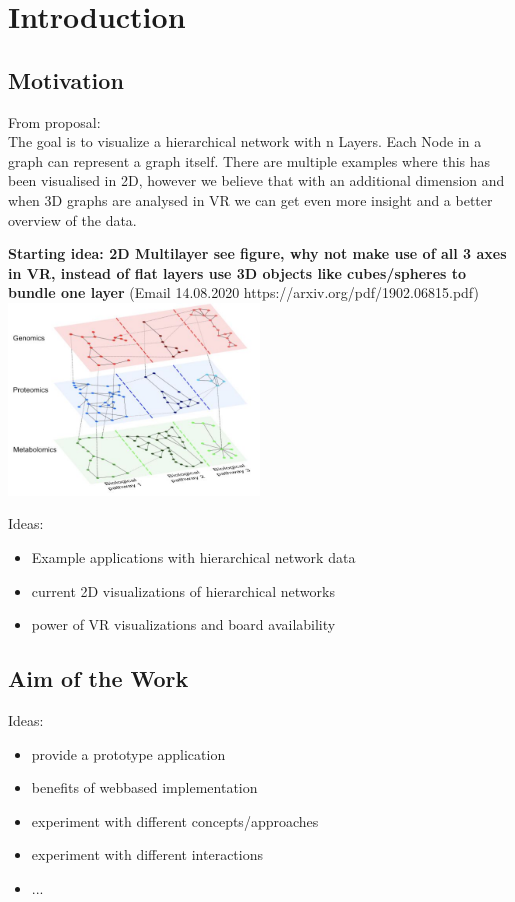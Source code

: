 \chapter{Introduction}

\section{Motivation}
From proposal: \\
The	 goal	 is	 to	 visualize	 a	 hierarchical	 network	 with	 n	 Layers.	 Each	 Node	 in	 a	 graph	 can	
represent	a	graph	itself.	There	are	multiple	examples	where	this	has	been	visualised	in	2D,	
however	we	believe	that	with	an	additional	dimension	and	when	3D	graphs	are	analysed	in	
VR	we	can	get	even	more	insight	and	a	better	overview	of	the	data.	

\textbf{Starting idea: 2D Multilayer see figure, why not make use of all 3 axes in VR, instead of flat layers use 3D objects like cubes/spheres to bundle one layer} (Email 14.08.2020 https://arxiv.org/pdf/1902.06815.pdf)
\includegraphics[width=0.5\textwidth]{chapters/graphics/2dmultilayerVis.jpg}

Ideas:
\begin{itemize}
    \item Example applications with hierarchical network data
    \item current 2D visualizations of hierarchical networks
    \item power of VR visualizations and board availability
\end{itemize}

\section{Aim of the Work}

Ideas:
\begin{itemize}
    \item provide a prototype application
    \item benefits of webbased implementation 
    \item experiment with different concepts/approaches
    \item experiment with different interactions
    \item ...
\end{itemize}

